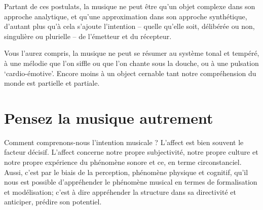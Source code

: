 \documentclass{article}
\begin{document}
\bigskip

Partant de ces postulats, la musique ne peut être qu'un objet complexe dans son approche analytique, et qu'une approximation dans son approche synthétique, d'autant plus qu'à cela s'ajoute l'intention -- quelle qu'elle soit, délibérée ou non, singulière ou plurielle -- de l'émetteur et du récepteur. 

Vous l'aurez compris, la musique ne peut se résumer au système tonal et tempéré, à une mélodie que l'on siffle ou que l'on chante sous la douche, ou à une pulsation `cardio-émotive'. Encore moins à un object cernable tant notre compréhension du monde est partielle et partiale. 

%  
%
\section{Pensez la musique autrement}

Comment comprenons-nous l’intention musicale ? L’affect est bien souvent le facteur décisif. L’affect concerne notre propre subjectivité, notre propre culture et notre propre expérience du phénomène sonore et ce, en terme circonstanciel. Aussi, c’est par le biais de la perception, phénomène physique et cognitif, qu’il nous est possible d’appréhender le phénomène musical en termes de formalisation et modélisation; c'est à dire appréhender la structure dans sa directivité et anticiper, prédire son potentiel.  
\end{document}
